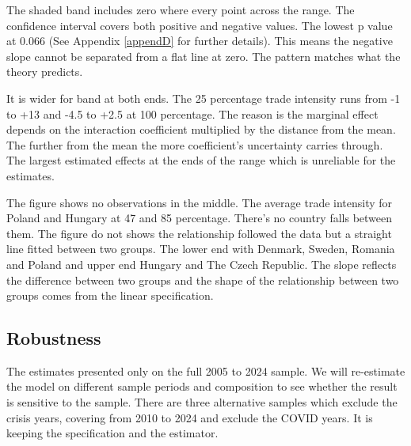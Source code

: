 \vspace{\baselineskip}

The shaded band includes zero where every point across the range.
The confidence interval covers both positive and negative values.
The lowest p value at 0.066 (See Appendix \ref{appendD} for further details).
This means the negative slope cannot be separated from a flat line at zero.
The pattern matches what the theory predicts.

\vspace{\baselineskip}

It is wider for band at both ends.
The 25 percentage trade intensity runs from -1 to +13 and -4.5 to +2.5 at 100 percentage.
The reason is the marginal effect depends on the interaction coefficient multiplied by the distance from the mean.
The further from the mean the more coefficient's uncertainty carries through.
The largest estimated effects at the ends of the range which is unreliable for the estimates.

\vspace{\baselineskip}
The figure shows no observations in the middle.
The average trade intensity for Poland and Hungary at 47 and 85 percentage.
There's no country falls between them.
The figure do not shows the relationship followed the data but a straight line fitted between two groups.
The lower end with Denmark, Sweden, Romania and Poland and upper end Hungary and The Czech Republic.
The slope reflects the difference between two groups and the shape of the relationship between two groups comes from the linear specification.

\subsection{Robustness}\label{sec:robustness}

The estimates presented only on the full 2005 to 2024 sample.
We will re-estimate the model on different sample periods and composition to see whether the result is sensitive to the sample.
There are three alternative samples which exclude the crisis years, covering from 2010 to 2024 and exclude the COVID years.
It is keeping the specification and the estimator.

